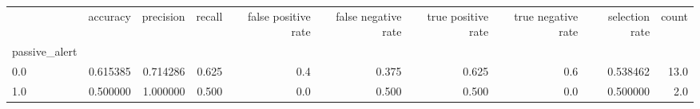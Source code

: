 \begin{tabular}{lrrrrrrrrr}
\toprule
{} &  accuracy &  precision &  recall &  false positive rate &  false negative rate &  true positive rate &  true negative rate &  selection rate &  count \\
passive\_alert &           &            &         &                      &                      &                     &                     &                 &        \\
\midrule
0.0           &  0.615385 &   0.714286 &   0.625 &                  0.4 &                0.375 &               0.625 &                 0.6 &        0.538462 &   13.0 \\
1.0           &  0.500000 &   1.000000 &   0.500 &                  0.0 &                0.500 &               0.500 &                 0.0 &        0.500000 &    2.0 \\
\bottomrule
\end{tabular}
